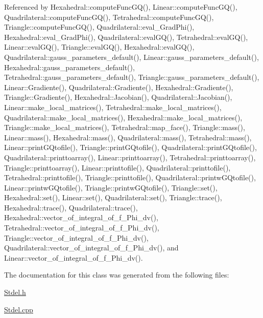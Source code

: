 Referenced by Hexahedral\+::compute\+Func\+G\+Q(), Linear\+::compute\+Func\+G\+Q(), Quadrilateral\+::compute\+Func\+G\+Q(), Tetrahedral\+::compute\+Func\+G\+Q(), Triangle\+::compute\+Func\+G\+Q(), Quadrilateral\+::eval\+\_\+\+Grad\+Phi(), Hexahedral\+::eval\+\_\+\+Grad\+Phi(), Quadrilateral\+::eval\+G\+Q(), Tetrahedral\+::eval\+G\+Q(), Linear\+::eval\+G\+Q(), Triangle\+::eval\+G\+Q(), Hexahedral\+::eval\+G\+Q(), Quadrilateral\+::gauss\+\_\+parameters\+\_\+default(), Linear\+::gauss\+\_\+parameters\+\_\+default(), Hexahedral\+::gauss\+\_\+parameters\+\_\+default(), Tetrahedral\+::gauss\+\_\+parameters\+\_\+default(), Triangle\+::gauss\+\_\+parameters\+\_\+default(), Linear\+::\+Gradiente(), Quadrilateral\+::\+Gradiente(), Hexahedral\+::\+Gradiente(), Triangle\+::\+Gradiente(), Hexahedral\+::\+Jacobian(), Quadrilateral\+::\+Jacobian(), Linear\+::make\+\_\+local\+\_\+matrices(), Tetrahedral\+::make\+\_\+local\+\_\+matrices(), Quadrilateral\+::make\+\_\+local\+\_\+matrices(), Hexahedral\+::make\+\_\+local\+\_\+matrices(), Triangle\+::make\+\_\+local\+\_\+matrices(), Tetrahedral\+::map\+\_\+face(), Triangle\+::mass(), Linear\+::mass(), Hexahedral\+::mass(), Quadrilateral\+::mass(), Tetrahedral\+::mass(), Linear\+::print\+G\+Qtofile(), Triangle\+::print\+G\+Qtofile(), Quadrilateral\+::print\+G\+Qtofile(), Quadrilateral\+::printtoarray(), Linear\+::printtoarray(), Tetrahedral\+::printtoarray(), Triangle\+::printtoarray(), Linear\+::printtofile(), Quadrilateral\+::printtofile(), Tetrahedral\+::printtofile(), Triangle\+::printtofile(), Quadrilateral\+::printw\+G\+Qtofile(), Linear\+::printw\+G\+Qtofile(), Triangle\+::printw\+G\+Qtofile(), Triangle\+::set(), Hexahedral\+::set(), Linear\+::set(), Quadrilateral\+::set(), Triangle\+::trace(), Hexahedral\+::trace(), Quadrilateral\+::trace(), Hexahedral\+::vector\+\_\+of\+\_\+integral\+\_\+of\+\_\+f\+\_\+\+Phi\+\_\+dv(), Tetrahedral\+::vector\+\_\+of\+\_\+integral\+\_\+of\+\_\+f\+\_\+\+Phi\+\_\+dv(), Triangle\+::vector\+\_\+of\+\_\+integral\+\_\+of\+\_\+f\+\_\+\+Phi\+\_\+dv(), Quadrilateral\+::vector\+\_\+of\+\_\+integral\+\_\+of\+\_\+f\+\_\+\+Phi\+\_\+dv(), and Linear\+::vector\+\_\+of\+\_\+integral\+\_\+of\+\_\+f\+\_\+\+Phi\+\_\+dv().



The documentation for this class was generated from the following files\+:\begin{DoxyCompactItemize}
\item 
\hyperlink{Stdel_8h}{Stdel.\+h}\item 
\hyperlink{Stdel_8cpp}{Stdel.\+cpp}\end{DoxyCompactItemize}
